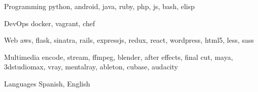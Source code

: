 

\begin{cvskills}

  \cvskill
    {Programming} %
    {python, android, java, ruby, php, js, bash, elisp} %

  \cvskill
    {DevOps} %
    {docker, vagrant, chef} %

  \cvskill
    {Web} %
    {aws, flask, sinatra, rails, expressjs, redux, react, wordpress, html5, less, sass} %

  \cvskill
    {Multimedia} %
    {encode, stream, ffmpeg, blender, after effects, final cut, maya, 3dstudiomax, vray, mentalray, ableton, cubase, audacity} %

  \cvskill
    {Languages} %
    {Spanish, English} %

\end{cvskills}
